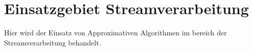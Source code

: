 \section{Einsatzgebiet Streamverarbeitung}
Hier wird der Einsatz von Approximativen Algorithmen im bereich der Streamverarbeitung behandelt.